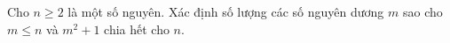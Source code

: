\ifshowproblem
\begin{problem}\label{example:MEMO-2015-T-P8}
    Cho \( n \ge 2 \) là một số nguyên.  
    Xác định số lượng các số nguyên dương \( m \) sao cho \( m \le n \) và \( m^2 + 1 \) chia hết cho \( n \).
\end{problem}
\fi

\fi